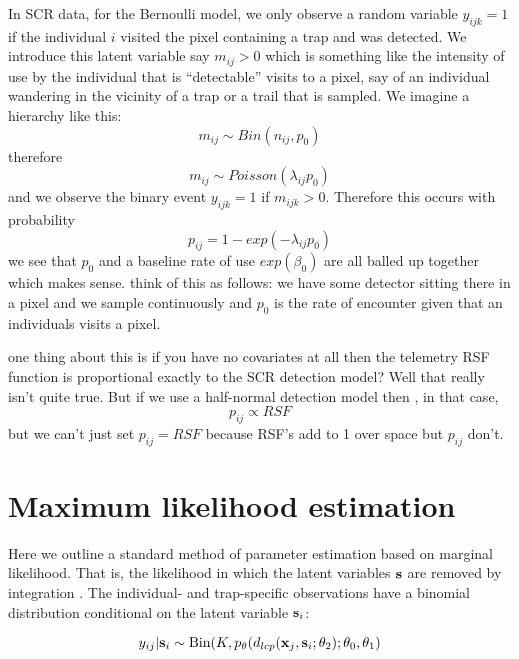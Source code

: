 In SCR data, for the Bernoulli model, 
 we only observe a random variable 
$y_{ijk} = 1$  if the individual $i$ visited the pixel
containing a trap and was detected. 
We introduce this latent variable say  $m_{ij}>0$ which is something
like the intensity of use by the individual that is
  ``detectable'' visits to a pixel, say of an
individual wandering in the vicinity of a trap or a trail that is
sampled. 
We imagine a hierarchy like this:
\[
m_{ij} \sim Bin(n_{ij}, p_{0})
\]
therefore
\[
m_{ij} \sim Poisson( \lambda_{ij} p_{0} )
\]
and
we observe the binary event $y_{ijk} = 1$ if $m_{ijk}>0$. Therefore 
this occurs with probability 
\[
 p_{ij} = 1-exp(- \lambda_{ij} p_{0} ) 
\]
we see that $p_{0}$ and a baseline rate of use  $exp(\beta_{0})$ are
all balled up together which makes sense. 
think of this as follows: we have some detector sitting there in a
pixel and we sample continuously and $p_{0}$ is the rate of encounter
given that an individuals visits a pixel. 




one thing about this is if you have no covariates at all then
the telemetry RSF function is proportional exactly to the SCR 
detection model? Well that really isn't quite true. But if 
we use a half-normal detection model then , in that case, 
\[
p_{ij} \propto RSF
\]
but we can't just set $p_{ij} = RSF$ because RSF's add to 1 over space
but $p_{ij}$ don't. 



\section{Maximum likelihood estimation}
\label{sec.mle}

Here we outline a standard method of parameter estimation based on
marginal likelihood. That is, the likelihood in which the latent
variables ${\bf s}$ are removed by integration \citep{borchers_efford:2008}.
The individual- and trap-specific observations have a binomial
distribution conditional on the latent variable ${\bf s}_{i}$:

\begin{equation}
	y_{ij}| {\bf s}_{i} \sim \mbox{Bin}(K, p_{\theta}(d_{lcp}({\bf x}_{j},{\bf s}_{i};\theta_{2}); \theta_{0}, \theta_{1})
\label{mle.eq.cond-on-s}
\end{equation}

